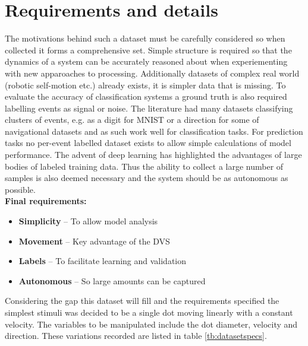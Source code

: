 \section{Requirements and details}
The motivations behind such a dataset must be carefully considered so when collected it forms a comprehensive set.
Simple structure is required so that the dynamics of a system can be accurately reasoned about when experiementing with new apparoaches to processing. 
Additionally datasets of complex real world (robotic self-motion etc.) already exists, it is simpler data that is missing.
To evaluate the accuracy of classification systems a ground truth is also required labelling events as signal or noise. 
The literature had many datasets classifying clusters of events, e.g. as a digit for MNIST or a direction for some of navigational datasets and as such work well for classification tasks.
For prediction tasks no per-event labelled dataset exists to allow simple calculations of model performance.  
The advent of deep learning has highlighted the advantages of large bodies of labeled training data. 
Thus the ability to collect a large number of samples is also deemed necessary and the system should be as autonomous as possible. \\ 
\textbf{Final requirements:}

\begin{itemize}
    \itemsep-0.5em
    \item \textbf{Simplicity} -- To allow model analysis
    \item \textbf{Movement} -- Key advantage of the DVS
    \item \textbf{Labels} -- To facilitate learning and validation
    \item \textbf{Autonomous} -- So large amounts can be captured
\end{itemize}



Considering the gap this dataset will fill and the requirements specified the simplest stimuli was decided to be a single dot moving linearly with a constant velocity. 
The variables to be manipulated include the dot diameter, velocity and direction. 
These variations recorded are listed in table \ref{tb:datasetspecs}.


